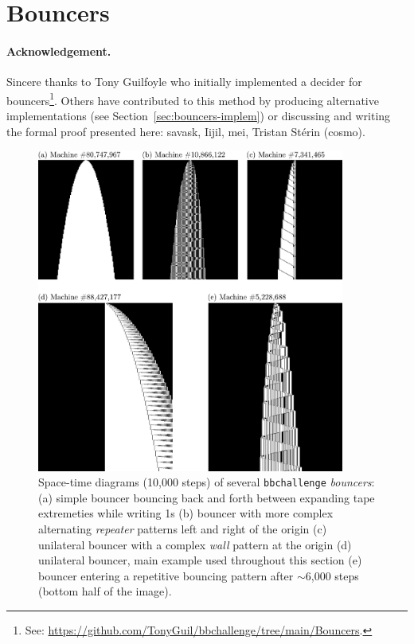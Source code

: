 
\section{Bouncers}\label{sec:bouncers}

\paragraph{Acknowledgement.}  Sincere thanks to Tony Guilfoyle who initially implemented a decider for bouncers\footnote{See: \url{https://github.com/TonyGuil/bbchallenge/tree/main/Bouncers}.}.
Others have contributed to this method by producing alternative implementations (see Section~\ref{sec:bouncers-implem}) or discussing and writing the formal proof presented here: savask, Iijil, mei, Tristan Stérin (cosmo).


\begin{figure}[h!]
    \centering
    \includegraphics*[width=0.9\textwidth]{figures/bouncers/bouncers.pdf}
    \caption{Space-time diagrams (10,000 steps) of several \texttt{bbchallenge} \textit{bouncers}: (a) simple bouncer bouncing back and forth between expanding tape extremeties while writing 1s (b) bouncer with more complex alternating \textit{repeater} patterns left and right of the origin (c) unilateral bouncer with a complex \textit{wall} pattern at the origin (d) unilateral bouncer, main example used throughout this section (e) bouncer entering a repetitive bouncing pattern after $\sim$6,000 steps (bottom half of the image).}\label{fig:bouncers}
\end{figure}

